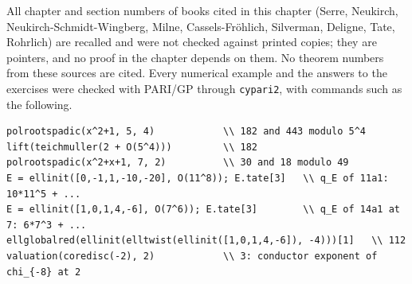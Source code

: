 All chapter and section numbers of books cited in this chapter (Serre, Neukirch, Neukirch-Schmidt-Wingberg, Milne, Cassels-Fr\"ohlich, Silverman, Deligne, Tate,
Rohrlich) are recalled and were not checked against printed copies; they are pointers, and no proof in the chapter depends on them. No theorem numbers from
these sources are cited. Every numerical example and the answers to the exercises were checked with PARI/GP \cite{PARI} through \texttt{cypari2}, with
commands such as the following.
\begin{lstlisting}[language=GP]
polrootspadic(x^2+1, 5, 4)            \\ 182 and 443 modulo 5^4
lift(teichmuller(2 + O(5^4)))         \\ 182
polrootspadic(x^2+x+1, 7, 2)          \\ 30 and 18 modulo 49
E = ellinit([0,-1,1,-10,-20], O(11^8)); E.tate[3]   \\ q_E of 11a1: 10*11^5 + ...
E = ellinit([1,0,1,4,-6], O(7^6)); E.tate[3]        \\ q_E of 14a1 at 7: 6*7^3 + ...
ellglobalred(ellinit(elltwist(ellinit([1,0,1,4,-6]), -4)))[1]   \\ 112
valuation(coredisc(-2), 2)            \\ 3: conductor exponent of chi_{-8} at 2
\end{lstlisting}
